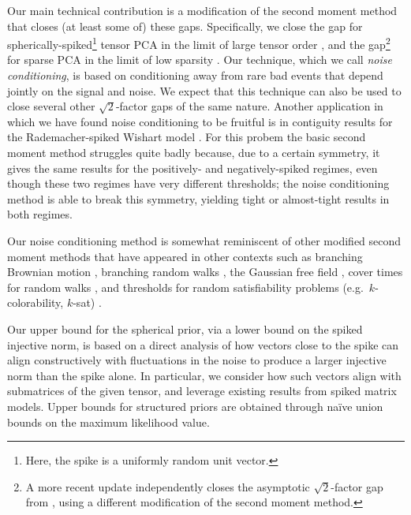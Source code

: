\documentclass{article}
\begin{document}
Our main technical contribution is a modification of the second moment method that closes (at least some of) these gaps. Specifically, we close the gap for spherically-spiked\footnote{Here, the spike is a uniformly random unit vector.} tensor PCA in the limit of large tensor order \cite{mrz}, and the gap\footnote{A more recent update \cite{bmvvx} independently closes the asymptotic $\sqrt{2}$-factor gap from \cite{bmvx}, using a different modification of the second moment method.} for sparse PCA in the limit of low sparsity \cite{bmvx}. Our technique, which we call \emph{noise conditioning}, is based on conditioning away from rare bad events that depend jointly on the signal and noise. We expect that this technique can also be used to close several other $\sqrt{2}$-factor gaps of the same nature. Another application in which we have found noise conditioning to be fruitful is in contiguity results for the Rademacher-spiked Wishart model \cite{pwbm}. For this probem the basic second moment method struggles quite badly because, due to a certain symmetry, it gives the same results for the positively- and negatively-spiked regimes, even though these two regimes have very different thresholds; the noise conditioning method is able to break this symmetry, yielding tight or almost-tight results in both regimes.

Our noise conditioning method is somewhat reminiscent of other modified second moment methods that have appeared in other contexts such as branching Brownian motion \cite{bramson-branching}, branching random walks \cite{aidekon-branching,conv-branching}, the Gaussian free field \cite{bdg-gff,tightness-gaussian-field,conv-gaussian-field}, cover times for random walks \cite{cover-times}, and thresholds for random satisfiability problems (e.g.\ $k$-colorability, $k$-sat) \cite{condensation-hypergraph,catching-naesat,chasing-k-colorability,going-after-ksat,asymptotic-ksat}.







Our upper bound for the spherical prior, via a lower bound on the spiked injective norm, is based on a direct analysis of how vectors close to the spike can align constructively with fluctuations in the noise to produce a larger injective norm than the spike alone. In particular, we consider how such vectors align with submatrices of the given tensor, and leverage existing results from spiked matrix models. Upper bounds for structured priors are obtained through na\"ive union bounds on the maximum likelihood value.
\end{document}
